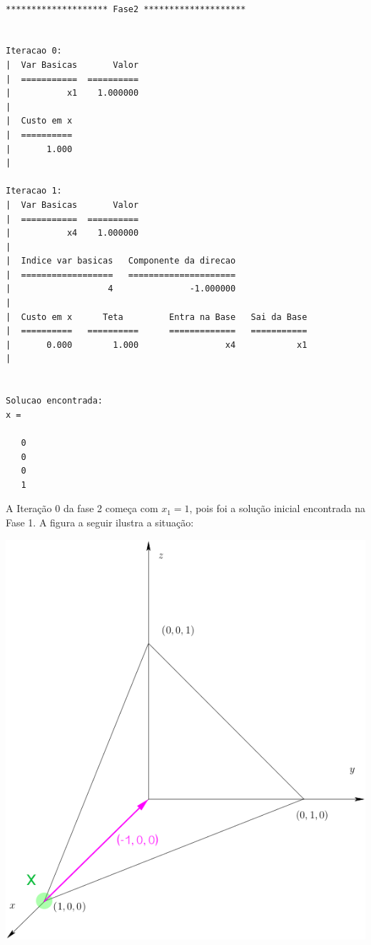 \documentclass[12pt]{article}
\begin{document}
	\lstset {firstnumber=29}
	\begin{lstlisting}[style=term]

******************** Fase2 ********************


Iteracao 0:
|  Var Basicas       Valor
|  ===========  ==========
|           x1    1.000000
|  
|  Custo em x
|  ==========
|       1.000
|  

Iteracao 1:
|  Var Basicas       Valor
|  ===========  ==========
|           x4    1.000000
|  
|  Indice var basicas   Componente da direcao
|  ==================   =====================
|                   4               -1.000000
|  
|  Custo em x      Teta         Entra na Base   Sai da Base
|  ==========   ==========      =============   ===========
|       0.000        1.000                 x4            x1
|  


Solucao encontrada: 
x = 

   0
   0
   0
   1
	\end{lstlisting}
	
	A Iteração 0 da fase 2 começa com $x_1 = 1$, pois foi a solução inicial encontrada na Fase 1. A figura a seguir ilustra a situação:
	
	\begin{center}
	\includegraphics[scale=0.6]{xyz2}	
	\end{center}
	
\end{document}
